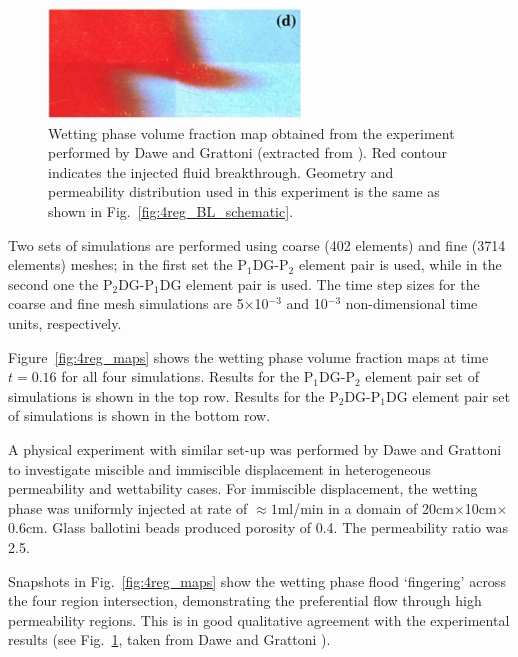 \documentclass[times]{fldauth}
\newcommand{\PN}[2][error]{P$_{#1}$DG-P$_{#2}$}
\begin{document}
\begin{figure}[h!]
  \begin{center}
    \includegraphics[width=0.6\textwidth]{Real_quadrant}
    \caption{Wetting phase volume fraction map obtained from the experiment performed by Dawe and Grattoni (extracted from \cite{dawe_2008}). Red contour indicates the injected fluid breakthrough. Geometry and permeability distribution used in this experiment is the same as shown in Fig.~\ref{fig:4reg_BL_schematic}. \label{fig:dawe_real}}
  \end{center}
\end{figure}

Two sets of simulations are performed using coarse (402 elements) and
fine (3714 elements) meshes; in the first set the \PN[1]{2} element
pair is used, while in the second one the \PN[2]{1}DG element pair is
used. The time step sizes for the coarse and fine mesh simulations are
5$\times$10$^{-3}$ and 10$^{-3}$ non-dimensional time units,
respectively.

Figure~\ref{fig:4reg_maps} shows the wetting phase volume fraction maps
at time $t=0.16$ for all four simulations. Results for the
\PN[1]{2} element pair set of simulations is shown in the top row.
Results for the \PN[2]{1}DG element pair set of simulations is shown
in the bottom row.

A physical experiment with similar set-up was performed by Dawe and Grattoni
\cite{dawe_2008} to investigate miscible and immiscible displacement
in heterogeneous permeability and wettability cases. For immiscible
displacement, the wetting phase was uniformly injected at rate of
$\approx 1$ml/min in a domain of 20cm$\times$10cm$\times$0.6cm. Glass
ballotini beads produced porosity of 0.4. The permeability ratio was
2.5.

Snapshots in Fig.~\ref{fig:4reg_maps} show the wetting phase flood
`fingering' across the four region intersection, demonstrating the
preferential flow through high permeability regions. This is in good
qualitative agreement with the experimental results
(see Fig.~\ref{fig:dawe_real}, taken from Dawe and Grattoni \cite{dawe_2008}).
\end{document}
